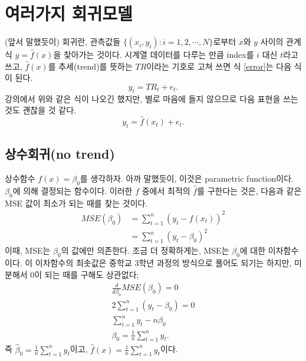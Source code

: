 \documentclass{article}
\begin{document}
\section{여러가지 회귀모델}
(앞서 말했듯이) 회귀란, 관측값들 \(\{(x_i,y_i):i=1,2,\cdots,N\}\)로부터 \(x\)와 \(y\) 사이의 관계식 \(y=\hat f(x)\)을 찾아가는 것이다.
시계열 데이터를 다루는 만큼 index를 \(i\) 대신 \(t\)라고 쓰고, \(\hat f(x)\)를 추세(trend)를 뜻하는 $TR$이라는 기호로 고쳐 쓰면 식 \eqref{error}는 다음 식이 된다.
\[y_t=TR_t+e_t.\]
강의에서 위와 같은 식이 나오긴 했지만, 별로 마음에 들지 않으므로 다음 표현을 쓰는 것도 괜찮을 것 같다.
\[y_t=\hat f(x_t)+e_t.\]

\subsection{상수회귀(no trend)}
상수함수 \(f(x)=\beta_0\)를 생각하자.
아까 말했듯이, 이것은 parametric function이다.
\(\beta_0\)에 의해 결정되는 함수이다.
이러한 \(f\) 중에서 최적의 \(\hat f\)를 구한다는 것은, 다음과 같은 MSE 값이 최소가 되는 때를 찾는 것이다.
\begin{align*}
MSE(\beta_0)
& = \sum_{t=1}^n(y_t-f(x_t))^2\\
& = \sum_{t=1}^n(y_t-\beta_0)^2
\end{align*}
이때, MSE는 \(\beta_0\)의 값에만 의존한다.
조금 더 정확하게는, MSE는 \(\beta_0\)에 대한 이차함수이다.
이 이차함수의 최솟값은 중학교 3학년 과정의 방식으로 풀어도 되기는 하지만, 미분해서 0이 되는 때를 구해도 상관없다;
\begin{gather*}
\frac{d}{d\beta_0}MSE(\beta_0)=0\\
2\sum_{t=1}^n(y_t-\beta_0)=0\\
\sum_{t=1}^ny_t-n\beta_0\\
\beta_0=\frac1n\sum_{t=1}^ny_t.
\end{gather*}
즉 \(\hat\beta_0=\frac1n\sum_{t=1}^ny_t\)이고, \(\hat f(x)=\frac1n\sum_{t=1}^ny_t\)이다.


\end{document}
